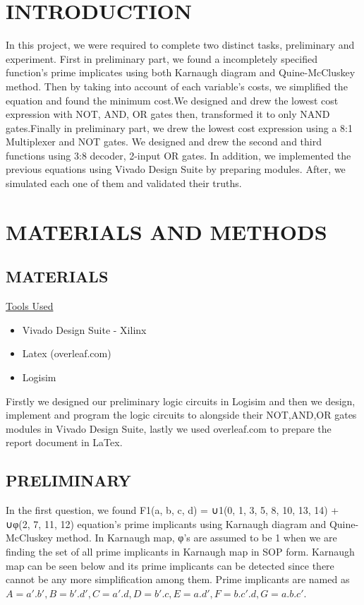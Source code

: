 \documentclass[pdftex,12pt,a4paper]{article}
\begin{document}
\section{INTRODUCTION}
In this project, we were required to complete two distinct tasks, preliminary and experiment. First in preliminary part, we found a incompletely specified function's prime implicates using both Karnaugh diagram and Quine-McCluskey method. Then by taking into account of each variable's costs, we simplified the equation and found the minimum cost.We designed and drew the lowest cost expression with NOT, AND, OR gates then, transformed it to only NAND gates.Finally in preliminary part, we drew the lowest cost expression using a 8:1 Multiplexer and NOT gates. We designed and drew the second and third functions using 3:8 decoder, 2-input OR gates. In addition, we implemented the previous equations using Vivado Design Suite by preparing modules. After, we simulated each one of them and validated their truths.

\section{MATERIALS AND METHODS}

\subsection{MATERIALS}
\underline{Tools Used}
\begin{itemize}
    \item {Vivado Design Suite - Xilinx}
    \item{Latex (overleaf.com)}
    \item{Logisim}
\end{itemize}
Firstly we designed our preliminary logic circuits in Logisim and then we design, implement and program the logic circuits to alongside their NOT,AND,OR gates modules in Vivado Design Suite, lastly we used overleaf.com to prepare the report document in LaTex.



\subsection{PRELIMINARY}
In the first question, we found F1(a, b, c, d) = ∪1(0, 1, 3, 5, 8, 10, 13, 14) + ∪φ(2, 7, 11, 12) equation's prime implicants using Karnaugh diagram and Quine-McCluskey method. In Karnaugh map, φ's are assumed to be 1 when we are finding the set of all prime implicants in Karnaugh map in SOP form. Karnaugh map can be seen below and its prime implicants can be detected since there cannot be any more simplification among them. Prime implicants are named as \(A= a'.b', B= b'.d', C= a'.d, D= b'.c, E=a.d', F= b.c'.d, G=a.b.c'\). 
\end{document}
